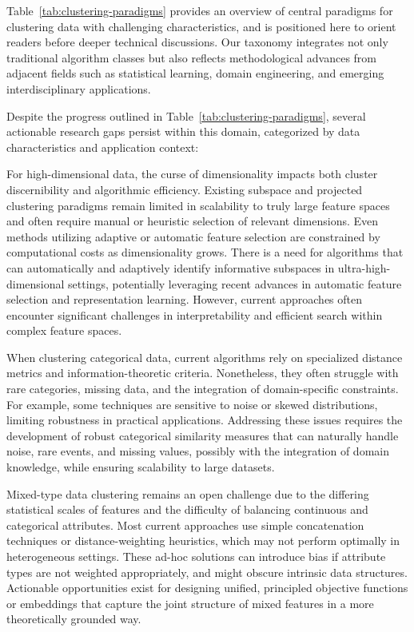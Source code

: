 \documentclass[sigconf]{acmart}
\begin{document}
Table~\ref{tab:clustering-paradigms} provides an overview of central paradigms for clustering data with challenging characteristics, and is positioned here to orient readers before deeper technical discussions. Our taxonomy integrates not only traditional algorithm classes but also reflects methodological advances from adjacent fields such as statistical learning, domain engineering, and emerging interdisciplinary applications.

Despite the progress outlined in Table~\ref{tab:clustering-paradigms}, several actionable research gaps persist within this domain, categorized by data characteristics and application context:

For high-dimensional data, the curse of dimensionality impacts both cluster discernibility and algorithmic efficiency. Existing subspace and projected clustering paradigms remain limited in scalability to truly large feature spaces and often require manual or heuristic selection of relevant dimensions. Even methods utilizing adaptive or automatic feature selection are constrained by computational costs as dimensionality grows. There is a need for algorithms that can automatically and adaptively identify informative subspaces in ultra-high-dimensional settings, potentially leveraging recent advances in automatic feature selection and representation learning. However, current approaches often encounter significant challenges in interpretability and efficient search within complex feature spaces.

When clustering categorical data, current algorithms rely on specialized distance metrics and information-theoretic criteria. Nonetheless, they often struggle with rare categories, missing data, and the integration of domain-specific constraints. For example, some techniques are sensitive to noise or skewed distributions, limiting robustness in practical applications. Addressing these issues requires the development of robust categorical similarity measures that can naturally handle noise, rare events, and missing values, possibly with the integration of domain knowledge, while ensuring scalability to large datasets.

Mixed-type data clustering remains an open challenge due to the differing statistical scales of features and the difficulty of balancing continuous and categorical attributes. Most current approaches use simple concatenation techniques or distance-weighting heuristics, which may not perform optimally in heterogeneous settings. These ad-hoc solutions can introduce bias if attribute types are not weighted appropriately, and might obscure intrinsic data structures. Actionable opportunities exist for designing unified, principled objective functions or embeddings that capture the joint structure of mixed features in a more theoretically grounded way.
\end{document}
